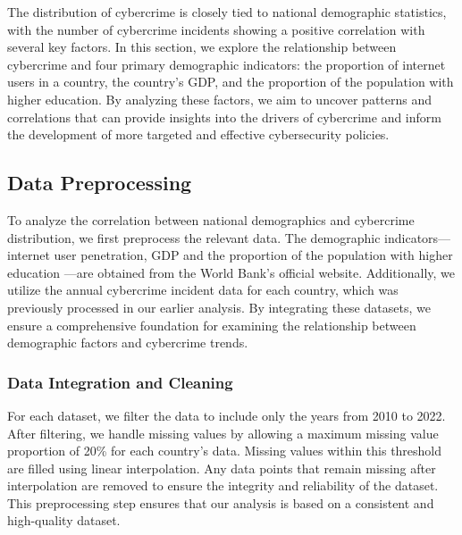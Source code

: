 The distribution of cybercrime is closely tied to national demographic statistics,
with the number of cybercrime incidents showing a positive correlation with several key factors.
In this section, we explore the relationship between cybercrime and four primary demographic indicators:
the proportion of internet users in a country,
the country's GDP, and the proportion of the population with higher education.
By analyzing these factors,
we aim to uncover patterns and correlations that can provide insights into the drivers of cybercrime
and inform the development of more targeted and effective cybersecurity policies.
\subsection{Data Preprocessing}\label{subsec:data-preprocessing} %
    To analyze the correlation between national demographics and cybercrime distribution,
    we first preprocess the relevant data.
    The demographic indicators—internet user penetration\cite{it-net-user-zs}, 
    GDP\cite{ny-gdp-mktp-cd} and 
    the proportion of the population with higher education\cite{se-ter-enrr}
    —are obtained from the World Bank's official website.
    Additionally, we utilize the annual cybercrime incident data for each country,
    which was previously processed in our earlier analysis.
    By integrating these datasets,
    we ensure a comprehensive foundation for examining the relationship between demographic factors and cybercrime trends.

    \subsubsection{Data Integration and Cleaning} %
        For each dataset, we filter the data to include only the years from 2010 to 2022.
        After filtering,
        we handle missing values by allowing a maximum missing value proportion of 20\% for each country's data.
        Missing values within this threshold are filled using linear interpolation.
        Any data points that remain missing after interpolation
        are removed to ensure the integrity and reliability of the dataset.
        This preprocessing step ensures that our analysis is based on a consistent and high-quality dataset.

\subsection{} %
